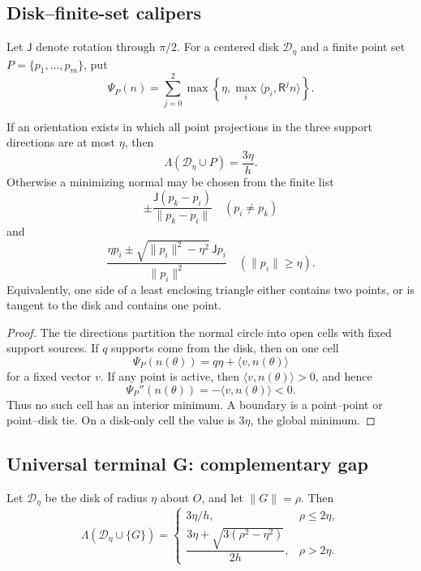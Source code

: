 \subsection{Disk--finite-set calipers}

Let $\mathsf J$ denote rotation through $\pi/2$.  For a centered disk
$\mathcal D_\eta$ and a finite point set $P=\{p_1,\ldots,p_m\}$, put
\[
 \Psi_P(n)=
 \sum_{j=0}^2
 \max\left\{\eta,\max_i\langle p_i,\mathsf R^j n\rangle\right\}.
\]

\begin{proposition}
\label{prop:new-disk-finite-caliper}
If an orientation exists in which all point projections in the three support
directions are at most $\eta$, then
\[
 \Lambda(\mathcal D_\eta\cup P)=\frac{3\eta}{h}.
\]
Otherwise a minimizing normal may be chosen from the finite list
\[
 \pm\frac{\mathsf J(p_k-p_i)}{\|p_k-p_i\|}
 \quad(p_i\ne p_k)
\]
and
\[
 \frac{\eta p_i\pm
 \sqrt{\|p_i\|^2-\eta^2}\,\mathsf Jp_i}{\|p_i\|^2}
 \quad(\|p_i\|\ge\eta).
\]
Equivalently, one side of a least enclosing triangle either contains two
points, or is tangent to the disk and contains one point.
\end{proposition}

\begin{proof}
The tie directions partition the normal circle into open cells with fixed
support sources.  If $q$ supports come from the disk, then on one cell
\[
 \Psi_P(n(\theta))=q\eta+\langle v,n(\theta)\rangle
\]
for a fixed vector $v$.  If any point is active, then
$\langle v,n(\theta)\rangle>0$, and hence
\[
 \Psi_P''(n(\theta))=-\langle v,n(\theta)\rangle<0.
\]
Thus no such cell has an interior minimum.  A boundary is a point--point or
point--disk tie.  On a disk-only cell the value is $3\eta$, the global
minimum.
\end{proof}

\subsection{Universal terminal G: complementary gap}

\begin{lemma}
\label{lem:new-disk-point-formula}
Let $\mathcal D_\eta$ be the disk of radius $\eta$ about $O$, and let
$\|G\|=\rho$.  Then
\[
 \Lambda(\mathcal D_\eta\cup\{G\})=
 \begin{cases}
  3\eta/h,&\rho\le2\eta,\\[2mm]
  \dfrac{3\eta+\sqrt{3(\rho^2-\eta^2)}}{2h},&\rho>2\eta.
 \end{cases}
 \tag{6.27}
\]
\end{lemma}


